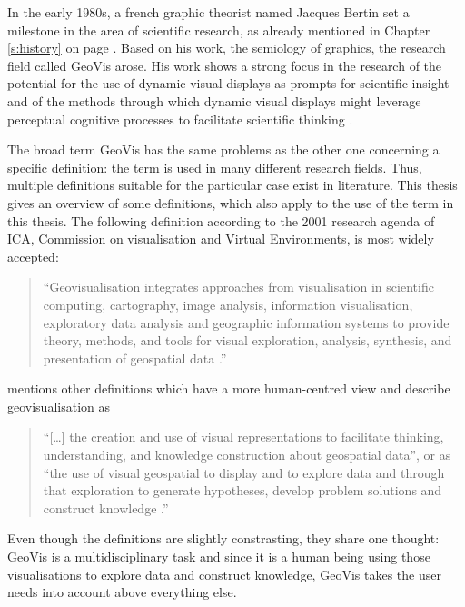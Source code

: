 In the early 1980s, a french graphic theorist named Jacques Bertin set a milestone in the area of scientific research, as already mentioned in Chapter \ref{s:history} on page \pageref{crossref:bertain}. Based on his work, the semiology of graphics, the research field called \ac{GeoVis} arose. His work shows a strong focus in the research of the potential for the use of dynamic visual displays as prompts for scientific insight and of the methods through which dynamic visual displays might leverage perceptual cognitive processes to facilitate scientific thinking .

The broad term \ac{GeoVis} has the same problems as the other one concerning a specific definition: the term is used in many different research fields. Thus, multiple definitions suitable for the particular case exist in literature. This thesis gives an overview of some definitions, which also apply to the use of the term in this thesis.
The following definition according to the 2001 research agenda of \ac{ICA}, Commission on visualisation and Virtual Environments, is most widely accepted:
\begin{quote}
``Geovisualisation integrates approaches from visualisation in scientific computing, cartography, image analysis, information visualisation, exploratory data analysis and geographic information systems to provide theory, methods, and tools for visual exploration, analysis, synthesis, and presentation of geospatial data .''
\end{quote}

\citeauthor{Noellenburg2007} mentions other definitions which have a more human-centred view and describe geovisualisation as
\begin{quote}
``[\ldots] the creation and use of visual representations to facilitate thinking, understanding, and knowledge construction about geospatial data'', or as ``the use of visual geospatial to display and to explore data and through that exploration to generate hypotheses, develop problem solutions and construct knowledge .''
\end{quote}

\newpage
Even though the definitions are slightly constrasting, they share one thought: \ac{GeoVis} is a multidisciplinary task and since it is a human being using those visualisations to explore data and construct knowledge, \ac{GeoVis} takes the user needs into account above everything else.

\cbend